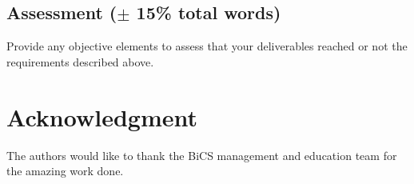 \subsection{Assessment ($\pm$ 15\% total words)}
Provide any objective elements to assess that your deliverables reached or not the requirements described above. 
\section*{Acknowledgment}
The authors would like to thank the BiCS management and education team for the amazing work done.
